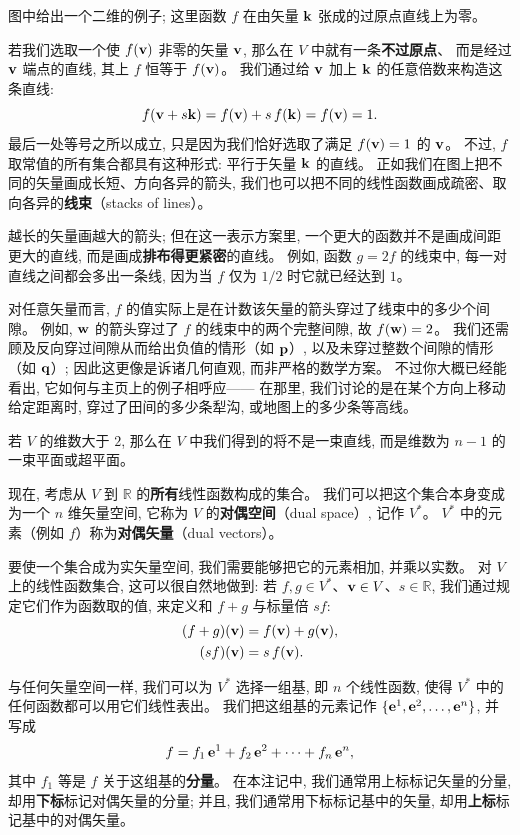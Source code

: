 
图中给出一个二维的例子; 这里函数 $f$ 在由矢量 $\mathbf{k}$ 张成的过原点直线上为零。

若我们选取一个使 $f(\mathbf{v})$ 非零的矢量 $\mathbf{v}$, 那么在 $V$ 中就有一条\textbf{不过原点}、
而是经过 $\mathbf{v}$ 端点的直线, 其上 $f$ 恒等于 $f(\mathbf{v})$。
我们通过给 $\mathbf{v}$ 加上 $\mathbf{k}$ 的任意倍数来构造这条直线:
\begin{equation}
f(\mathbf{v} + s \mathbf{k}) = f(\mathbf{v}) + s\, f(\mathbf{k}) = f(\mathbf{v}) = 1.
\end{equation}
最后一处等号之所以成立, 只是因为我们恰好选取了满足 $f(\mathbf{v})=1$ 的 $\mathbf{v}$。
不过, $f$ 取常值的所有集合都具有这种形式: 平行于矢量 $\mathbf{k}$ 的直线。
正如我们在图上把不同的矢量画成长短、方向各异的箭头,
我们也可以把不同的线性函数画成疏密、取向各异的\textbf{线束}（stacks of lines）。

越长的矢量画越大的箭头; 但在这一表示方案里, 一个更大的函数并不是画成间距更大的直线,
而是画成\textbf{排布得更紧密}的直线。
例如, 函数 $g = 2 f$ 的线束中, 每一对直线之间都会多出一条线,
因为当 $f$ 仅为 $1/2$ 时它就已经达到 $1$。

对任意矢量而言, $f$ 的值实际上是在计数该矢量的箭头穿过了线束中的多少个间隙。
例如, $\mathbf{w}$ 的箭头穿过了 $f$ 的线束中的两个完整间隙, 故 $f(\mathbf{w})=2$。
我们还需顾及反向穿过间隙从而给出负值的情形（如 $\mathbf{p}$）,
以及未穿过整数个间隙的情形（如 $\mathbf{q}$）;
因此这更像是诉诸几何直观, 而非严格的数学方案。
不过你大概已经能看出, 它如何与主页上的例子相呼应——
在那里, 我们讨论的是在某个方向上移动给定距离时, 穿过了田间的多少条犁沟, 或地图上的多少条等高线。

若 $V$ 的维数大于 $2$, 那么在 $V$ 中我们得到的将不是一束直线, 而是维数为 $n-1$ 的一束平面或超平面。

现在, 考虑从 $V$ 到 $\mathbb{R}$ 的\textbf{所有}线性函数构成的集合。
我们可以把这个集合本身变成为一个 $n$ 维矢量空间, 它称为 $V$ 的\textbf{对偶空间}（dual space）, 记作 $V^{*}$。
$V^{*}$ 中的元素（例如 $f$）称为\textbf{对偶矢量}（dual vectors）。

要使一个集合成为实矢量空间, 我们需要能够把它的元素相加, 并乘以实数。
对 $V$ 上的线性函数集合, 这可以很自然地做到:
若 $f,g \in V^{*}$、$\mathbf{v} \in V$、$s \in \mathbb{R}$,
我们通过规定它们作为函数取的值, 来定义和 $f+g$ 与标量倍 $s f$:
\begin{align}
(f+g)(\mathbf{v}) &= f(\mathbf{v}) + g(\mathbf{v}), \\
(s f)(\mathbf{v}) &= s\, f(\mathbf{v}).
\end{align}

与任何矢量空间一样, 我们可以为 $V^{*}$ 选择一组基, 即 $n$ 个线性函数,
使得 $V^{*}$ 中的任何函数都可以用它们线性表出。
我们把这组基的元素记作 $\{\mathbf{e}^{1}, \mathbf{e}^{2}, \dots, \mathbf{e}^{n}\}$, 并写成
\begin{equation}
f = f_{1}\,\mathbf{e}^{1} + f_{2}\,\mathbf{e}^{2} + \dots + f_{n}\,\mathbf{e}^{n},
\end{equation}
其中 $f_{1}$ 等是 $f$ 关于这组基的\textbf{分量}。
在本注记中, 我们通常用上标标记矢量的分量, 却用\textbf{下标}标记对偶矢量的分量;
并且, 我们通常用下标标记基中的矢量, 却用\textbf{上标}标记基中的对偶矢量。

